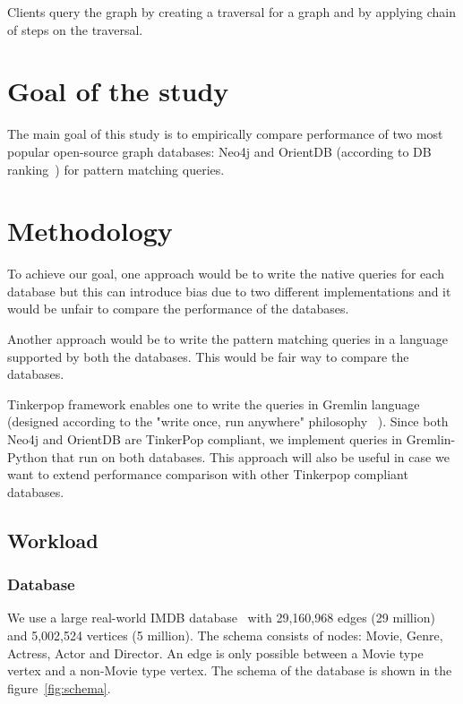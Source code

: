 Clients query the graph by creating a traversal for a graph and by applying chain of steps on the traversal.

\section{Goal of the study}

The main goal of this study is to empirically compare performance of two most popular open-source graph databases: Neo4j and OrientDB (according to DB ranking~\cite{dbranking}) for pattern matching queries.

\section{Methodology}

To achieve our goal, one approach would be to write the native queries for each database but this can introduce bias due to two different implementations and it would be unfair to compare the performance of the databases.

Another approach would be to write the pattern matching queries in a language supported by both the databases. This would be fair way to compare the databases. 

Tinkerpop framework enables one to write the queries in Gremlin language (designed according to the "write once, run anywhere" philosophy ~\cite{gremlin}). Since both Neo4j and OrientDB are TinkerPop compliant, we implement queries in Gremlin-Python that run on both databases. This approach will also be useful in case we want to extend performance comparison with other Tinkerpop compliant databases.


\subsection{Workload}

\subsubsection{Database}

We use a large real-world IMDB database~\cite{IMDb96:online} with 29,160,968 edges (29 million) and 5,002,524 vertices (5 million). The schema consists of nodes: Movie, Genre, Actress, Actor and Director. An edge is only possible between a Movie type vertex and a non-Movie type vertex. The schema of the database is shown in the figure~\ref{fig:schema}. 

